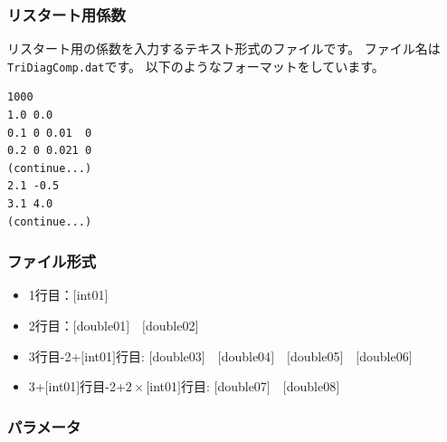 \documentclass[12pt,titlepage]{jarticle}
\begin{document}
\newpage
\subsubsection{リスタート用係数}\label{subsubsec:recoeff}
リスタート用の係数を入力するテキスト形式のファイルです。
ファイル名は\verb|TriDiagComp.dat|です。
以下のようなフォーマットをしています。
\\
\begin{minipage}{10cm}
  \begin{screen}
\begin{verbatim}
1000
1.0 0.0
0.1 0 0.01  0
0.2 0 0.021 0
(continue...)
2.1 -0.5
3.1 4.0
(continue...)
\end{verbatim}
  \end{screen}
\end{minipage}


\subsubsection{ファイル形式}
\begin{itemize}
\item  1行目：$[$int01$]$
\item  2行目：$[$double01$]$~~$[$double02$]$
\item  3行目-2+$[$int01$]$行目: $[$double03$]$~~$[$double04$]$~~$[$double05$]$~~$[$double06$]$
\item  3+$[$int01$]$行目-2+$2\times[$int01$]$行目: $[$double07$]$~~$[$double08$]$
\end{itemize}

\subsubsection{パラメータ}
\end{document}
